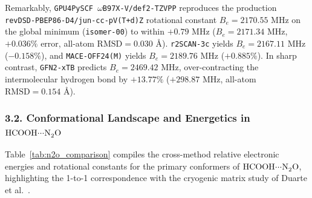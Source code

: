 \documentclass[journal=jpclcd,manuscript=article]{achemso}
\begin{document}
Remarkably, \texttt{GPU4PySCF $\omega$B97X-V/def2-TZVPP} reproduces the production \texttt{revDSD-PBEP86-D4/jun-cc-pV(T+d)Z} rotational constant $B_e = 2170.55\text{ MHz}$ on the global minimum (\texttt{isomer-00}) to within $+0.79\text{ MHz}$ ($B_e = 2171.34\text{ MHz}$, $+0.036\%$ error, all-atom $\mathrm{RMSD} = 0.030\text{ \AA}$). \texttt{r2SCAN-3c} yields $B_e = 2167.11\text{ MHz}$ ($-0.158\%$), and \texttt{MACE-OFF24(M)} yields $B_e = 2189.76\text{ MHz}$ ($+0.885\%$). In sharp contrast, \texttt{GFN2-xTB} predicts $B_e = 2469.42\text{ MHz}$, over-contracting the intermolecular hydrogen bond by $+13.77\%$ ($+298.87\text{ MHz}$, all-atom $\mathrm{RMSD} = 0.154\text{ \AA}$).

\subsubsection{3.2. Conformational Landscape and Energetics in $\ce{HCOOH\bond{...}N2O}$}
Table~\ref{tab:n2o_comparison} compiles the cross-method relative electronic energies and rotational constants for the primary conformers of $\ce{HCOOH\bond{...}N2O}$, highlighting the 1-to-1 correspondence with the cryogenic matrix study of Duarte et al.\ \cite{Duarte2017}.
\end{document}
